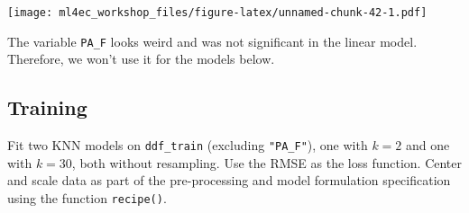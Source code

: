 \documentclass[
]{book}
\begin{document}
\texttt{[image: ml4ec\_workshop\_files/figure-latex/unnamed-chunk-42-1.pdf]}

The variable \texttt{PA\_F} looks weird and was not significant in the linear model. Therefore, we won't use it for the models below.

\hypertarget{training-5}{%
\subsection{Training}\label{training-5}}

Fit two KNN models on \texttt{ddf\_train} (excluding \texttt{"PA\_F"}), one with \(k = 2\) and one with \(k = 30\), both without resampling. Use the RMSE as the loss function. Center and scale data as part of the pre-processing and model formulation specification using the function \texttt{recipe()}.
\end{document}
